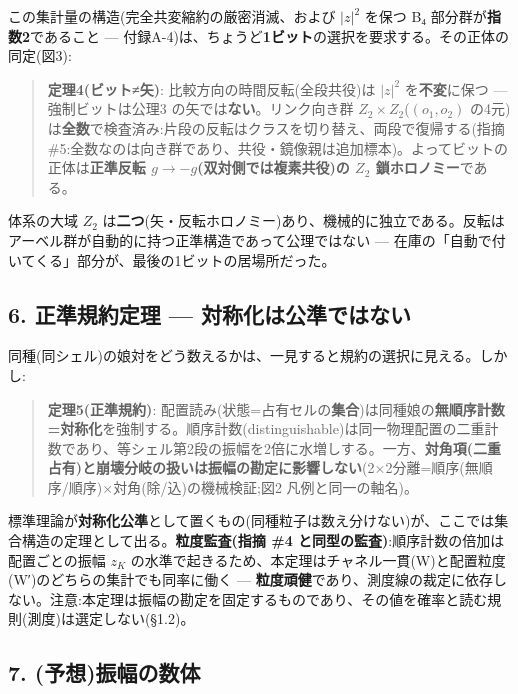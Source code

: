 \documentclass[
]{ltjsarticle}
\begin{document}
この集計量の構造(完全共変縮約の厳密消滅、および \(|z|^2\) を保つ B₄
部分群が\textbf{指数2}であること ---
付録A-4)は、ちょうど\textbf{1ビット}の選択を要求する。その正体の同定(図3):

\begin{quote}
\textbf{定理4(ビット≠矢)}: 比較方向の時間反転(全段共役)は \(|z|^2\)
を\textbf{不変}に保つ --- 強制ビットは公理3
の矢では\textbf{ない}。リンク向き群 \(Z_2\times Z_2\)(\((o_1,o_2)\)
の4元)は\textbf{全数}で検査済み:片段の反転はクラスを切り替え、両段で復帰する(指摘
\#5:全数なのは向き群であり、共役・鏡像親は追加標本)。よってビットの正体は\textbf{正準反転
\(g\to-g\)(双対側では複素共役)の \(Z_2\) 鎖ホロノミー}である。
\end{quote}

体系の大域 \(Z_2\)
は\textbf{二つ}(矢・反転ホロノミー)あり、機械的に独立である。反転はアーベル群が自動的に持つ正準構造であって公理ではない
--- 在庫の「自動で付いてくる」部分が、最後の1ビットの居場所だった。

\subsection{6. 正準規約定理 ---
対称化は公準ではない}\label{ux6b63ux6e96ux898fux7d04ux5b9aux7406-ux5bfeux79f0ux5316ux306fux516cux6e96ux3067ux306fux306aux3044}

同種(同シェル)の娘対をどう数えるかは、一見すると規約の選択に見える。しかし:

\begin{quote}
\textbf{定理5(正準規約)}:
配置読み(状態=占有セルの\textbf{集合})は同種娘の\textbf{無順序計数=対称化}を強制する。順序計数(distinguishable)は同一物理配置の二重計数であり、等シェル第2段の振幅を2倍に水増しする。一方、\textbf{対角項(二重占有)と崩壊分岐の扱いは振幅の勘定に影響しない}(2×2分離=順序(無順序/順序)×対角(除/込)の機械検証;図2
凡例と同一の軸名)。
\end{quote}

標準理論が\textbf{対称化公準}として置くもの(同種粒子は数え分けない)が、ここでは集合構造の定理として出る。\textbf{粒度監査(指摘
\#4 と同型の監査)}:順序計数の倍加は配置ごとの振幅 \(z_K\)
の水準で起きるため、本定理はチャネル一貫(W)と配置粒度(W′)のどちらの集計でも同率に働く
---
\textbf{粒度頑健}であり、測度線の裁定に依存しない。注意:本定理は振幅の勘定を固定するものであり、その値を確率と読む規則(測度)は選定しない(§1.2)。

\subsection{7.
(予想)振幅の数体}\label{ux4e88ux60f3ux632fux5e45ux306eux6570ux4f53}
\end{document}
